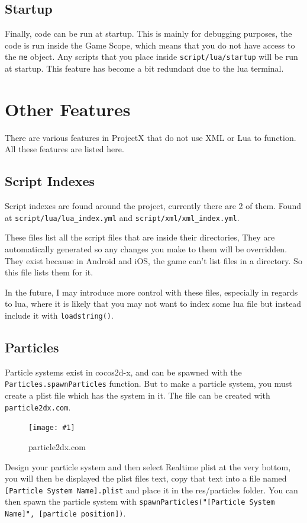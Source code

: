 \documentclass{book}
\newcommand{\hFigure}[2]
	{\begin{figure}[ht!]
		\centering
		\texttt{[image: \#1]}
		\caption{#2}
	\end{figure}}
\begin{document}
\section{Startup}
Finally, code can be run at startup. This is mainly for debugging purposes, the code is run inside the Game Scope, which means that you do not have access to the \texttt{me} object. Any scripts that you place inside \texttt{script/lua/startup} will be run at startup. This feature has become a bit redundant due to the lua terminal.

\chapter{Other Features}
There are various features in ProjectX that do not use XML or Lua to function. All these features are listed here.

\section{Script Indexes}
Script indexes are found around the project, currently there are 2 of them. Found at \texttt{script/lua/lua\_index.yml} and \texttt{script/xml/xml\_index.yml}.

These files list all the script files that are inside their directories, They are automatically generated so any changes you make to them will be overridden. They exist because in Android and iOS, the game can't list files in a directory. So this file lists them for it.

In the future, I may introduce more control with these files, especially in regards to lua, where it is likely that you may not want to index some lua file but instead include it with \texttt{loadstring()}.

\section{Particles}
Particle systems exist in cocos2d-x, and can be spawned with the \texttt{Particles.spawnParticles} function. But to make a particle system, you must create a plist file which has the system in it. The file can be created with \texttt{particle2dx.com}.

\hFigure{ParticleCreator.png}{particle2dx.com}

Design your particle system and then select Realtime plist at the very bottom, you will then be displayed the plist files text, copy that text into a file named \texttt{[Particle System Name].plist} and place it in the res/particles folder. You can then spawn the particle system with \texttt{spawnParticles("[Particle System Name]", [particle position])}.
\end{document}
